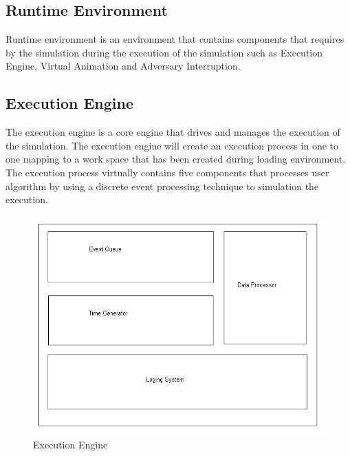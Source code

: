 \subsection{Runtime Environment}
Runtime environment is an environment that contains components that requires by the simulation during the execution of the simulation such as Execution Engine, Virtual Animation and Adversary Interruption.


\subsection{Execution Engine}
The execution engine is a core engine that drives and manages the execution of the simulation. The execution engine will create an execution process in one to one mapping to a work space that has been created during loading environment. The execution process virtually contains five components that processes user algorithm by using a discrete event processing technique to simulation the execution.

\begin{figure}[ht!]
\includegraphics[width=1.0\textwidth,keepaspectratio]{./figure43}
\caption{Execution Engine}
\label{pic:fig43}
\end{figure}


